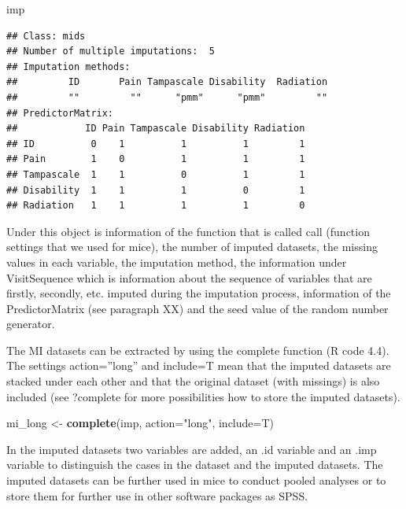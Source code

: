\documentclass[]{book}
\newenvironment{Shaded}{\begin{snugshade}}{\end{snugshade}}
\newcommand{\KeywordTok}[1]{\textcolor[rgb]{0.13,0.29,0.53}{\textbf{#1}}}
\newcommand{\DataTypeTok}[1]{\textcolor[rgb]{0.13,0.29,0.53}{#1}}
\newcommand{\StringTok}[1]{\textcolor[rgb]{0.31,0.60,0.02}{#1}}
\newcommand{\NormalTok}[1]{#1}
\theoremstyle{definition}
\theoremstyle{definition}
\theoremstyle{definition}
\theoremstyle{remark}
\begin{document}
\begin{Shaded}
\begin{Highlighting}[]
\NormalTok{imp}
\end{Highlighting}
\end{Shaded}

\begin{verbatim}
## Class: mids
## Number of multiple imputations:  5 
## Imputation methods:
##         ID       Pain Tampascale Disability  Radiation 
##         ""         ""      "pmm"      "pmm"         "" 
## PredictorMatrix:
##            ID Pain Tampascale Disability Radiation
## ID          0    1          1          1         1
## Pain        1    0          1          1         1
## Tampascale  1    1          0          1         1
## Disability  1    1          1          0         1
## Radiation   1    1          1          1         0
\end{verbatim}

Under this object is information of the function that is called call
(function settings that we used for mice), the number of imputed
datasets, the missing values in each variable, the imputation method,
the information under VisitSequence which is information about the
sequence of variables that are firstly, secondly, etc. imputed during
the imputation process, information of the PredictorMatrix (see
paragraph XX) and the seed value of the random number generator.

The MI datasets can be extracted by using the complete function (R code
4.4). The settings action=''long'' and include=T mean that the imputed
datasets are stacked under each other and that the original dataset
(with missings) is also included (see ?complete for more possibilities
how to store the imputed datasets).

\begin{Shaded}
\begin{Highlighting}[]
\NormalTok{mi_long <-}\StringTok{ }\KeywordTok{complete}\NormalTok{(imp, }\DataTypeTok{action=}\StringTok{"long"}\NormalTok{, }\DataTypeTok{include=}\NormalTok{T)}
\end{Highlighting}
\end{Shaded}

In the imputed datasets two variables are added, an .id variable and an
.imp variable to distinguish the cases in the dataset and the imputed
datasets. The imputed datasets can be further used in mice to conduct
pooled analyses or to store them for further use in other software
packages as SPSS.
\end{document}
